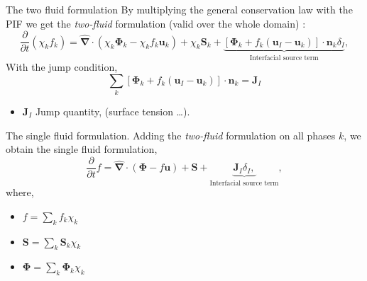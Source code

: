 \documentclass{sintefbeamer}
\newcommand{\nablabh}{\hat{\bm{\nabla}}}
\newcommand{\pddt}{\frac{\partial}{\partial t}}
\begin{document}
\begin{frame}
  {The two fluid formulation}
  By multiplying the general conservation law with the PIF we get the \textit{two-fluid} formulation (valid over the whole domain) :
  \begin{equation}
    \pddt (\chi_k f_k)
    = \nablabh \cdot (\chi_k \bm{\Phi}_k - \chi_k f_k \textbf{u}_k)
    + \chi_k \textbf{S}_k
    + \underbrace{
    \left[
        \bm{\Phi}_k 
        + f_k 
        \left(
            \textbf{u}_I
            - \textbf{u}_k
        \right) 
    \right]
    \cdot \textbf{n}_k \delta_I }_{\text{Interfacial source term}},
    \label{eq:two-fluid_global}
\end{equation}
With the jump condition, 
\begin{equation}
  \sum_k 
  \left[
      \bm{\Phi}_k 
      + f_k 
      \left(
          \textbf{u}_I
          - \textbf{u}_k
      \right) 
  \right]
  \cdot \textbf{n}_k
  = \textbf{J}_I
  \label{eq:general_jump}
\end{equation}
\begin{itemize}
  \item $\textbf{J}_I$ Jump quantity, (surface tension \ldots). 
\end{itemize}
\end{frame}

\begin{frame}{The single fluid formulation.}
  Adding the \textit{two-fluid} formulation on all phases $k$, we obtain the single fluid formulation, 
  \begin{equation}
    \pddt f
    = \nablabh \cdot (\bm{\Phi} - f \textbf{u})
    + \textbf{S}
    +\underbrace{ 
    \textbf{J}_I \delta_I,}_{\text{Interfacial source term}},
    \label{eq:one-fluid_global}
\end{equation}
where,
\begin{itemize}
  \item $f = \sum_k f_k \chi_k$
  \item $\textbf{S} = \sum_k \textbf{S}_k \chi_k$
  \item $\bm{\Phi} = \sum_k \bm{\Phi}_k \chi_k$
\end{itemize}
\end{frame}
\end{document}
